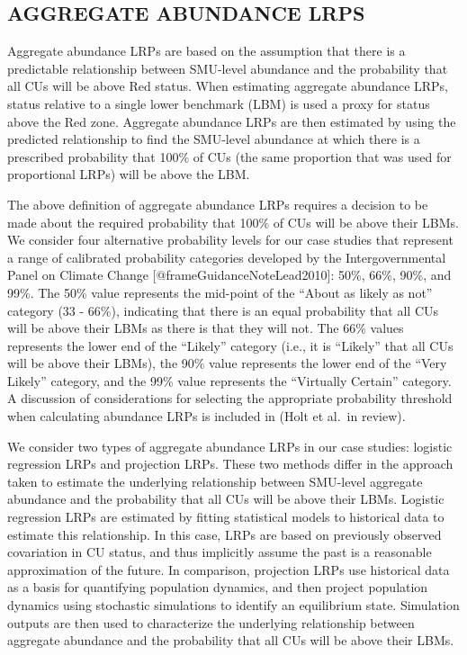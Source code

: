 \documentclass[
]{article}
\begin{document}
\hypertarget{aggAbundMethods}{%
\subsection{AGGREGATE ABUNDANCE LRPS}\label{aggAbundMethods}}

Aggregate abundance LRPs are based on the assumption that there is a
predictable relationship between SMU-level abundance and the probability
that all CUs will be above Red status. When estimating aggregate
abundance LRPs, status relative to a single lower benchmark (LBM) is
used a proxy for status above the Red zone. Aggregate abundance LRPs are
then estimated by using the predicted relationship to find the SMU-level
abundance at which there is a prescribed probability that 100\% of CUs
(the same proportion that was used for proportional LRPs) will be above
the LBM.

The above definition of aggregate abundance LRPs requires a decision to
be made about the required probability that 100\% of CUs will be above
their LBMs. We consider four alternative probability levels for our case
studies that represent a range of calibrated probability categories
developed by the Intergovernmental Panel on Climate Change
{[}@frameGuidanceNoteLead2010{]}: 50\%, 66\%, 90\%, and 99\%. The 50\%
value represents the mid-point of the ``About as likely as not''
category (33 - 66\%), indicating that there is an equal probability that
all CUs will be above their LBMs as there is that they will not. The
66\% values represents the lower end of the ``Likely'' category (i.e.,
it is ``Likely'' that all CUs will be above their LBMs), the 90\% value
represents the lower end of the ``Very Likely'' category, and the 99\%
value represents the ``Virtually Certain'' category. A discussion of
considerations for selecting the appropriate probability threshold when
calculating abundance LRPs is included in (Holt et al.~in review).

We consider two types of aggregate abundance LRPs in our case studies:
logistic regression LRPs and projection LRPs. These two methods differ
in the approach taken to estimate the underlying relationship between
SMU-level aggregate abundance and the probability that all CUs will be
above their LBMs. Logistic regression LRPs are estimated by fitting
statistical models to historical data to estimate this relationship. In
this case, LRPs are based on previously observed covariation in CU
status, and thus implicitly assume the past is a reasonable
approximation of the future. In comparison, projection LRPs use
historical data as a basis for quantifying population dynamics, and then
project population dynamics using stochastic simulations to identify an
equilibrium state. Simulation outputs are then used to characterize the
underlying relationship between aggregate abundance and the probability
that all CUs will be above their LBMs.
\end{document}
